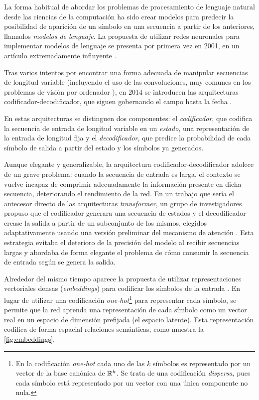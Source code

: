 La forma habitual de abordar los problemas de procesamiento de lenguaje natural desde las ciencias de la computación ha sido crear modelos para predecir la posibilidad de aparición de un símbolo en una secuencia a partir de los anteriores, llamados \textit{modelos de lenguaje}. La propuesta de utilizar redes neuronales para implementar modelos de lenguaje se presenta por primera vez en 2001, en un artículo extremadamente influyente \cite{bengio2000neural}. 

Tras varios intentos por encontrar una forma adecuada de manipular secuencias de longitud variable (incluyendo el uso de las convoluciones, muy comunes en los problemas de visión por ordenador \cite{collobert2011natural}), en 2014 se introducen las arquitecturas codificador-decodificador, que siguen gobernando el campo hasta la fecha \cite{sutskever2014sequence}.

En estas arquitecturas se distinguen dos componentes: el \textit{codificador}, que codifica la secuencia de entrada de longitud variable en un \textit{estado}, una representación de la entrada de longitud fija y el \textit{decodificador}, que predice la probabilidad de cada símbolo de salida a partir del estado y los símbolos ya generados.

Aunque elegante y generalizable, la arquitectura codificador-decodificador adolece de un grave problema: cuando la secuencia de entrada es larga, el contexto se vuelve incapaz de comprimir adecuadamente la información presente en dicha secuencia, deteriorando el rendimiento de la red. En un trabajo que sería el antecesor directo de las arquitecturas \textit{transformer}, un grupo de investigadores propuso que el codificador generara una secuencia de estados y el decodificador crease la salida a partir de un subconjunto de los mismos, elegidos adaptativamente usando una versión preliminar del mecanismo de atención \cite{bahdanau2014neural}. Esta estrategia evitaba el deterioro de la precisión del modelo al recibir secuencias largas y abordaba de forma elegante el problema de cómo consumir la secuencia de entrada según se genera la salida.

Alrededor del mismo tiempo aparece la propuesta de utilizar representaciones vectoriales densas (\textit{embeddings}) para codificar los símbolos de la entrada \cite{mikolov2013distributed}. En lugar de utilizar una codificación \textit{one-hot}\footnote{En la codificación \textit{one-hot} cada uno de las \( k \) símbolos es representado por un vector de la base canónica de \( \mathbb{R}^{k} \). Se trata de una codificación \textit{dispersa}, pues cada símbolo está representado por un vector con una única componente no nula.} para representar cada símbolo, se permite que la red aprenda una representación de cada símbolo como un vector real en un espacio de dimensión prefijada (el espacio latente). Esta representación  codifica de forma espacial relaciones semánticas, como muestra la \cref{fig:embeddings}. 

